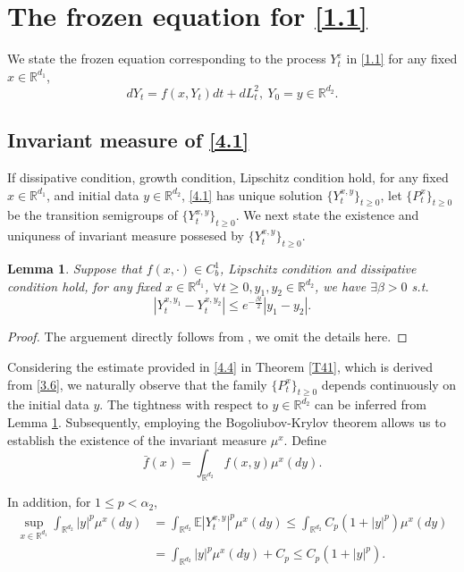 \documentclass[11pt,reqno]{amsart}
\newtheorem{lemma}{\indent Lemma}[section]
\numberwithin{equation}{section}
\begin{document}
\section{The frozen equation for \ref{1.1}}
We state the frozen equation corresponding to the process $Y_{t}^{\varepsilon}$ in \eqref{1.1} for any fixed $x\in \mathbb{R}^{d_{1} }$,
\begin{equation}\label{4.1}
	dY_{t}=f(x,Y_{t})dt+dL^{2}_{t},\ Y_{0}=y\in \mathbb{R}^{d_{2} }.
\end{equation}


\subsection{Invariant measure of \eqref{4.1}}
If dissipative condition, growth condition, Lipschitz condition hold, for any fixed  $x\in\mathbb{R}^{d_{1}}$, and initial data $y\in\mathbb{R}^{d_{2}}$, \eqref{4.1} has unique solution $ \{Y_{t}^{x,y}\}_{t\geq 0}$, let $ \{P_{t}^{x}\}_{t\geq 0} $ be the transition semigroups of $ \{Y_{t}^{x,y}\}_{t\geq 0}$. We next state the existence and uniquness of invariant measure possesed by  $ \{Y_{t}^{x,y}\}_{t\geq 0}$.


\begin{lemma}\label{L41}
	Suppose that $ f(x,\cdot)\in C^{1}_{b}$, Lipschitz condition and dissipative condition hold, for any fixed  $ x\in \mathbb{R}^{d_{1}}$, $\forall  t\geq0, y_{1}, y_{2}\in \mathbb{R}^{d_{2}}$, we have $\exists \beta>0$ s.t.
	$$ | Y_{t}^{ x, y_{1}}-Y_{t}^{x, y_{2}}|\leq e^{-\frac{\beta t}{2}}| y_{1}- y_{2}|.$$
\end{lemma}
\begin{proof}
	The arguement directly follows from \cite[Lemma 3.1]{SXX}, we omit the details here.
\end{proof}

Considering the estimate provided in \eqref{4.4} in Theorem \ref{T41}, which is derived from  \eqref{3.6}, we naturally observe that the family $ \{P_{t}^{x}\}_{t\geq 0} $ depends continuously on the initial data $y$. The tightness with respect to  $y\in\mathbb{R}^{d_{2}} $ can be inferred from  Lemma \ref{L41}.  Subsequently, employing the Bogoliubov-Krylov theorem allows us to establish the existence of the invariant measure $ \mu^{x}$. Define
$$ \bar{f}(x)=\int_{\mathbb{R}^{d_{2}}}f(x,y)\mu^{x}(dy).$$

 
In addition, for $1\leq p<\alpha_{2}$,
\begin{equation}\label{4.3}
	\begin{split}
		\sup_{x\in \mathbb{R}^{d_{1}}}\int_{\mathbb{R}^{d_{2}}}|y|^{p}\mu^{x}(dy)&=\int_{\mathbb{R}^{d_{2}}}\mathbb{E}|Y_{t}^{x,y}|^{p} \mu^{x}(dy)\leq  \int_{\mathbb{R}^{d_{2}}}C_{p}(1+|y|^{p}) \mu^{x}(dy)\\
		&=\int_{\mathbb{R}^{d_{2}}}|y|^{p} \mu^{x}(dy)+C_{p} \leq C_{p}(1+|y|^{p}).
	\end{split}
\end{equation}
\end{document}
